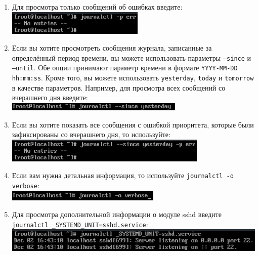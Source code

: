 \documentclass[12pt]{article}
\begin{document}
\begin{enumerate}
	\item Для просмотра только сообщений об ошибках введите:
	      \\\includegraphics{19.png}
	\item Если вы хотите просмотреть сообщения журнала, записанные за определённый период времени, вы можете использовать параметры \texttt{--since} и \texttt{--until}. Обе опции принимают параметр времени в формате \texttt{YYYY-MM-DD hh:mm:ss}. Кроме того, вы можете использовать \texttt{yesterday}, \texttt{today} и \texttt{tomorrow} в качестве параметров. Например, для просмотра всех сообщений со вчерашнего дня введите:
	      \\\includegraphics{20.png}
	\item Если вы хотите показать все сообщения с ошибкой приоритета, которые были зафиксированы со вчерашнего дня, то используйте:
	      \\\includegraphics{21.png}
	\item Если вам нужна детальная информация, то используйте \texttt{journalctl -o verbose}:
	      \\\includegraphics{22.png}
	\item Для просмотра дополнительной информации о модуле sshd введите \texttt{journalctl \_SYSTEMD\_UNIT=sshd.service}:
	      \\\includegraphics{23.png}
\end{enumerate}
\end{document}
